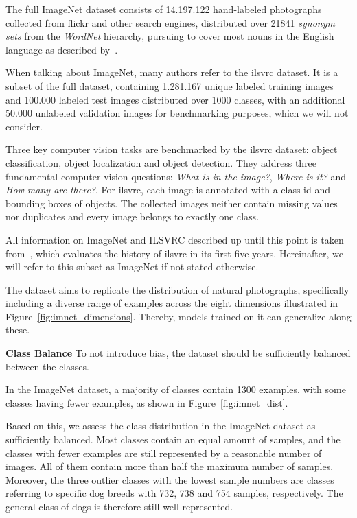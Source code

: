 The full ImageNet dataset consists of 14.197.122 hand-labeled photographs collected from flickr and other search
engines, distributed over 21841 \textit{synonym sets} from the
\textit{WordNet} hierarchy, pursuing to cover most nouns in the English language as described by~\cite{wordnet}.

When talking about ImageNet, many authors refer to the \ac{ilsvrc} dataset.
It is a subset of the full dataset, containing 1.281.167 unique labeled training images and 100.000 labeled test
images distributed over 1000 classes, with an additional 50.000 unlabeled validation images for benchmarking
purposes, which we will not consider.

Three key computer vision tasks are benchmarked by the \ac{ilsvrc} dataset: object classification, object
localization and object detection.
They address three fundamental computer vision questions: \textit{What is in the image?}, \textit{Where is it?} and
\textit{How many are there?}.
For \ac{ilsvrc}, each image is annotated with a class id and bounding boxes of objects.
The collected images neither contain missing values nor duplicates and every image belongs to exactly one class.

All information on ImageNet and ILSVRC described up until this point is taken from~\cite{imagenet_breakdown}, which
evaluates the history of \ac{ilsvrc} in its first five years.
Hereinafter, we will refer to this subset as ImageNet if not stated otherwise.

The dataset aims to replicate the distribution of natural photographs, specifically including a diverse range of
examples across the eight dimensions illustrated in Figure~\ref{fig:imnet_dimensions}.
Thereby, models trained on it can generalize along these.



\textbf{Class Balance}
To not introduce bias, the dataset should be sufficiently balanced between the classes.

In the ImageNet dataset, a majority of classes contain 1300 examples, with some classes having fewer examples, as
shown in Figure~\ref{fig:imnet_dist}.

Based on this, we assess the class distribution in the ImageNet dataset as sufficiently balanced.
Most classes contain an equal amount of samples, and the classes with fewer examples are still represented by a
reasonable number of images.
All of them contain more than half the maximum number of samples.
Moreover, the three outlier classes with the lowest sample numbers are classes referring to specific dog
breeds with 732, 738 and 754 samples, respectively.
The general class of dogs is therefore still well represented.

